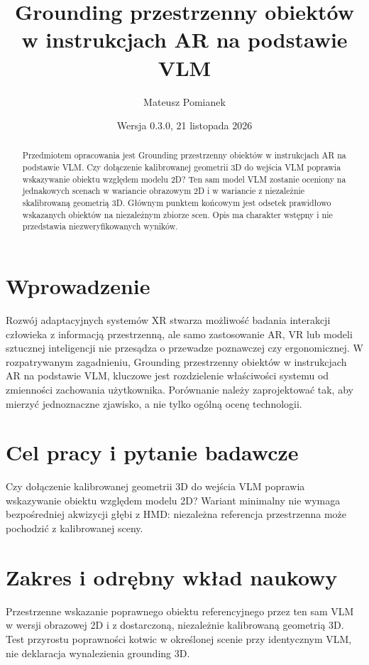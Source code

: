 \documentclass[11pt,a4paper]{article}
\title{Grounding przestrzenny obiektów w instrukcjach AR na podstawie VLM}
\author{Mateusz Pomianek}
\date{Wersja 0.3.0, 21 listopada 2026}
\begin{document}
\maketitle

\begin{abstract}

Przedmiotem opracowania jest Grounding przestrzenny obiektów w instrukcjach AR na podstawie VLM. Czy dołączenie kalibrowanej geometrii 3D do wejścia VLM poprawia wskazywanie obiektu względem modelu 2D? Ten sam model VLM zostanie oceniony na jednakowych scenach w wariancie obrazowym 2D i w wariancie z niezależnie skalibrowaną geometrią 3D. Głównym punktem końcowym jest odsetek prawidłowo wskazanych obiektów na niezależnym zbiorze scen. Opis ma charakter wstępny i nie przedstawia niezweryfikowanych wyników.

\end{abstract}

\section{Wprowadzenie}

Rozwój adaptacyjnych systemów XR stwarza możliwość badania interakcji człowieka z informacją przestrzenną, ale samo zastosowanie AR, VR lub modeli sztucznej inteligencji nie przesądza o przewadze poznawczej czy ergonomicznej. W rozpatrywanym zagadnieniu, Grounding przestrzenny obiektów w instrukcjach AR na podstawie VLM, kluczowe jest rozdzielenie właściwości systemu od zmienności zachowania użytkownika. Porównanie należy zaprojektować tak, aby mierzyć jednoznaczne zjawisko, a nie tylko ogólną ocenę technologii.

\section{Cel pracy i pytanie badawcze}

Czy dołączenie kalibrowanej geometrii 3D do wejścia VLM poprawia wskazywanie obiektu względem modelu 2D? Wariant minimalny nie wymaga bezpośredniej akwizycji głębi z HMD: niezależna referencja przestrzenna może pochodzić z kalibrowanej sceny.

\section{Zakres i odrębny wkład naukowy}
Przestrzenne wskazanie poprawnego obiektu referencyjnego przez ten sam VLM w wersji obrazowej 2D i z dostarczoną, niezależnie kalibrowaną geometrią 3D. Test przyrostu poprawności kotwic w określonej scenie przy identycznym VLM, nie deklaracja wynalezienia grounding 3D.
\end{document}
